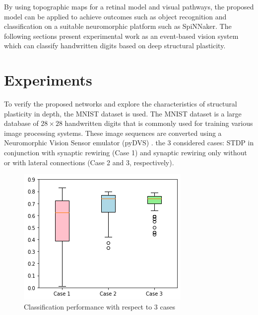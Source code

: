 \documentclass[letterpaper, 10 pt, conference]{ieeeconf}  %
\begin{document}
By using topographic maps for a retinal model and visual pathways, the proposed model can be applied to achieve outcomes such as object recognition and classification on a suitable neuromorphic platform such as SpiNNaker.
The following sections present experimental work as an event-based vision system which can classify handwritten digits based on deep structural plasticity.

\section{Experiments}\label{section:results}

To verify the proposed networks and explore the characteristics of structural plasticity in depth, the MNIST dataset is used. 
The MNIST dataset is a large database of $28 \times 28$ handwritten digits that is commonly used for training various image processing systems. 
These image sequences are converted using a Neuromorphic Vision Sensor emulator (pyDVS) \cite{garcia2016pydvs}.
the 3 considered cases: STDP in conjunction with synaptic rewiring (Case 1) and synaptic rewiring only without or with lateral connections (Case 2 and 3, respectively).

\begin{figure}[tbh]
    \centering
    \includegraphics[width=0.80\linewidth, trim=0cm 0cm 0cm 0cm, clip=true]{10trials/boxPlotCase}
    \caption{Classification performance with respect to 3 cases}
    \label{fig:bpWCases}
\end{figure}
\end{document}
